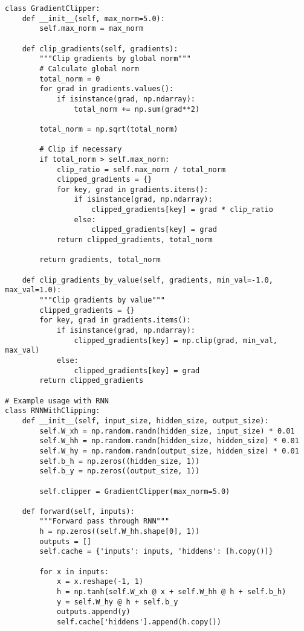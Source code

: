 ﻿\documentclass[12pt,a4paper]{article}
\begin{document}
\begin{lstlisting}
class GradientClipper:
    def __init__(self, max_norm=5.0):
        self.max_norm = max_norm
    
    def clip_gradients(self, gradients):
        """Clip gradients by global norm"""
        # Calculate global norm
        total_norm = 0
        for grad in gradients.values():
            if isinstance(grad, np.ndarray):
                total_norm += np.sum(grad**2)
        
        total_norm = np.sqrt(total_norm)
        
        # Clip if necessary
        if total_norm > self.max_norm:
            clip_ratio = self.max_norm / total_norm
            clipped_gradients = {}
            for key, grad in gradients.items():
                if isinstance(grad, np.ndarray):
                    clipped_gradients[key] = grad * clip_ratio
                else:
                    clipped_gradients[key] = grad
            return clipped_gradients, total_norm
        
        return gradients, total_norm
    
    def clip_gradients_by_value(self, gradients, min_val=-1.0, max_val=1.0):
        """Clip gradients by value"""
        clipped_gradients = {}
        for key, grad in gradients.items():
            if isinstance(grad, np.ndarray):
                clipped_gradients[key] = np.clip(grad, min_val, max_val)
            else:
                clipped_gradients[key] = grad
        return clipped_gradients

# Example usage with RNN
class RNNWithClipping:
    def __init__(self, input_size, hidden_size, output_size):
        self.W_xh = np.random.randn(hidden_size, input_size) * 0.01
        self.W_hh = np.random.randn(hidden_size, hidden_size) * 0.01
        self.W_hy = np.random.randn(output_size, hidden_size) * 0.01
        self.b_h = np.zeros((hidden_size, 1))
        self.b_y = np.zeros((output_size, 1))
        
        self.clipper = GradientClipper(max_norm=5.0)
    
    def forward(self, inputs):
        """Forward pass through RNN"""
        h = np.zeros((self.W_hh.shape[0], 1))
        outputs = []
        self.cache = {'inputs': inputs, 'hiddens': [h.copy()]}
        
        for x in inputs:
            x = x.reshape(-1, 1)
            h = np.tanh(self.W_xh @ x + self.W_hh @ h + self.b_h)
            y = self.W_hy @ h + self.b_y
            outputs.append(y)
            self.cache['hiddens'].append(h.copy())
        

\end{lstlisting}
\end{document}

